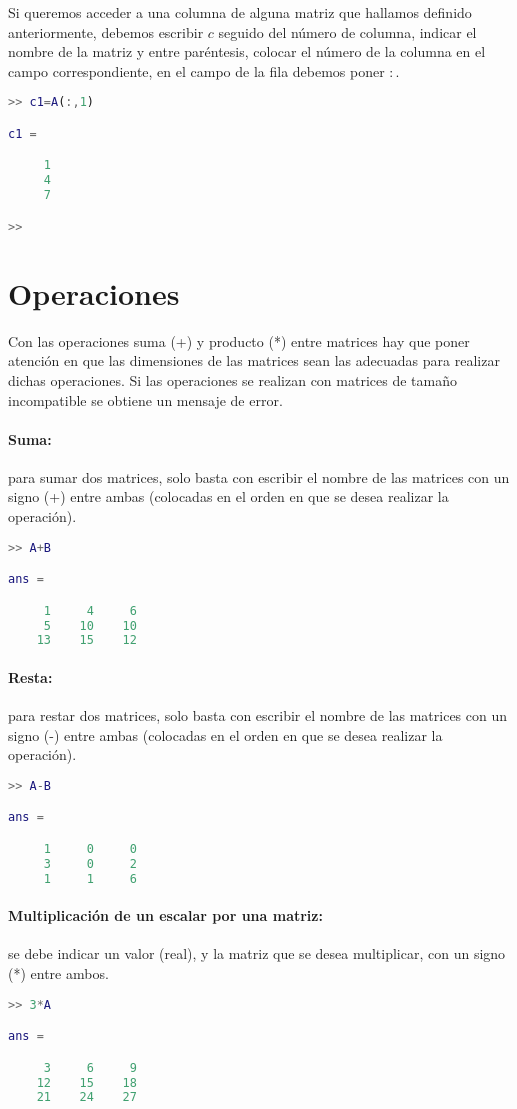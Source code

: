 Si queremos acceder a una columna de alguna matriz que hallamos definido anteriormente, debemos escribir $c$ seguido del número de columna, indicar el nombre de la matriz y entre paréntesis, colocar el número de la columna en el campo correspondiente, en el campo de la fila debemos poner $:$.
\begin{lstlisting}[language=Matlab]
>> c1=A(:,1)

c1 =

     1
     4
     7

>> 
\end{lstlisting}

\section{Operaciones}
Con las operaciones suma (+) y producto (*) entre matrices hay que poner atención en que las
dimensiones de las matrices sean las adecuadas para realizar dichas operaciones. Si las operaciones se realizan con matrices de tamaño incompatible se obtiene un mensaje de error.

\paragraph{Suma:} para sumar dos matrices, solo basta con escribir el nombre de las matrices con un signo (+) entre ambas (colocadas en el orden en que se desea realizar la operación).
\begin{lstlisting}[language=Matlab]
>> A+B

ans =

     1     4     6
     5    10    10
    13    15    12

\end{lstlisting}

\paragraph{Resta:} para restar dos matrices, solo basta con escribir el nombre de las matrices con un signo (-) entre ambas (colocadas en el orden en que se desea realizar la operación).
\begin{lstlisting}[language=Matlab]
>> A-B

ans =

     1     0     0
     3     0     2
     1     1     6

\end{lstlisting}

\paragraph{Multiplicación de un escalar por una matriz:} se debe indicar un valor (real), y la matriz que se desea multiplicar, con un signo (*) entre ambos.
\begin{lstlisting}[language=Matlab]
>> 3*A

ans =

     3     6     9
    12    15    18
    21    24    27

\end{lstlisting}

